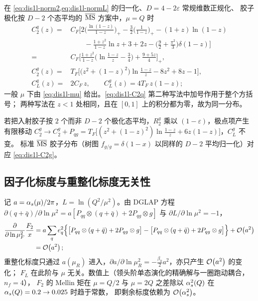 \begin{proposition}\label{prop:dis1l-coef}
\tagR\quad 在 \cref{eq:dis1l-norm2,eq:dis1l-normL} 的归一化、$D=4-2\varepsilon$ 常规维数正规化、
胶子极化按 $D-2$ 个态平均的 $\overline{\mathrm{MS}}$ 方案中，$\mu=Q$ 时
\begin{align}
C_2^q(z)={}&C_F\Big[2\Big(\frac{\ln(1-z)}{1-z}\Big)_+-\frac32\Big(\frac{1}{1-z}\Big)_+-(1+z)\ln(1-z)\nonumber\\
&\qquad-\frac{1+z^2}{1-z}\ln z+3+2z-\Big(\frac92+\frac{\pi^2}{3}\Big)\delta(1-z)\Big]\nonumber\\
={}&C_F\Big[\frac{1+z^2}{1-z}\Big(\ln\frac{1-z}{z}-\frac34\Big)+\frac{9+5z}{4}\Big]_+ ,\label{eq:dis1l-C2q}\\
C_2^g(z)={}&T_F\Big[\big(z^2+(1-z)^2\big)\ln\frac{1-z}{z}-8z^2+8z-1\Big],\label{eq:dis1l-C2g}\\
C_L^q(z)={}&2C_F\,z,\qquad C_L^g(z)=4T_F\,z(1-z);\label{eq:dis1l-CL}
\end{align}
一般 $\mu$ 下由 \cref{eq:dis1l-mu} 给出。\cref{eq:dis1l-C2q} 第二种写法中加号作用于整个方括号；
两种写法在 $z<1$ 处相同，且在 $[0,1]$ 上的积分都为零，故为同一分布。
\end{proposition}

\begin{remark}[胶子极化平均]
若把入射胶子按 $2$ 个而非 $D-2$ 个极化态平均，$R_2^g$ 乘以 $(1-\varepsilon)$，极点项产生有限移动
$C_2^g\to C_2^g+P_{qg}=T_F\big[(z^2+(1-z)^2)\ln\frac{1-z}{z}+6z(1-z)\big]$，$C_L^g$ 不变。
标准 $\overline{\mathrm{MS}}$ 胶子分布（树图 $f_{g/g}=\delta(1-x)$ 以同样的 $D-2$ 平均归一化）对应 \cref{eq:dis1l-C2g}。
\end{remark}

\subsection{因子化标度与重整化标度无关性}

记 $a=\alpha_s(\mu)/2\pi$，$L=\ln(Q^2/\mu^2)$。由 DGLAP 方程
$\partial(q+\bar q)/\partial\ln\mu^2=a[P_{qq}\otimes(q+\bar q)+2P_{qg}\otimes g]$ 与 $\partial L/\partial\ln\mu^2=-1$，
\begin{align}
\frac{\partial}{\partial\ln\mu_F^2}\frac{F_2}{x}
&=a\sum_qe_q^2\Big\{\big[P_{qq}\otimes(q+\bar q)+2P_{qg}\otimes g\big]-\big[P_{qq}\otimes(q+\bar q)+2P_{qg}\otimes g\big]\Big\}+\mathcal{O}\!\left(a^2\right)
\nonumber\\
&=\mathcal{O}\!\left(a^2\right);
\end{align}
重整化标度只通过 $a(\mu_R)$ 进入，$\partial a/\partial\ln\mu_R^2=-\frac{\beta_0}{2}a^2$，亦只产生 $\mathcal{O}\!\left(a^2\right)$ 的变化；
$F_L$ 在此阶与 $\mu$ 无关。数值上（领头阶单态演化的精确解与一圈跑动耦合，$n_f=4$），
$F_{2}$ 的 Mellin 矩在 $\mu=Q/2$ 与 $\mu=2Q$ 之差除以 $\alpha_s^2(Q)$ 在 $\alpha_s(Q)=0.2\to0.025$ 时趋于常数，
即剩余标度依赖为 $\mathcal{O}\!\left(\alpha_s^2\right)$。


